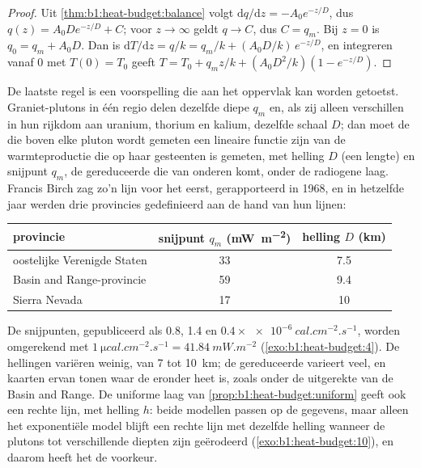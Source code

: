 \begin{proof}
Uit \cref{thm:b1:heat-budget:balance} volgt $\mathrm dq/\mathrm dz =
-A_0e^{-z/D}$, dus $q(z) = A_0 D e^{-z/D} + C$; voor $z \to \infty$ geldt $q \to C$,
dus $C = q_m$. Bij $z = 0$ is $q_0 = q_m + A_0 D$. Dan is $\mathrm dT/\mathrm dz =
q/k = q_m/k + (A_0D/k)\,e^{-z/D}$, en integreren vanaf $0$ met $T(0) = T_0$ geeft
$T = T_0 + q_m z/k + (A_0 D^2/k)(1 - e^{-z/D})$.
\end{proof}

De laatste regel is een voorspelling die aan het oppervlak kan worden getoetst. Graniet-plutons in één regio delen dezelfde diepe  $q_m$ en, als zij alleen verschillen in hun rijkdom aan uranium, thorium en kalium, dezelfde schaal $D$; dan moet de  die boven elke pluton wordt gemeten een lineaire functie zijn van de warmteproductie die op haar gesteenten is gemeten, met helling $D$ (een lengte) en snijpunt $q_m$, de gereduceerde  die van onderen komt, onder de radiogene laag. Francis Birch zag zo'n lijn voor het eerst, gerapporteerd in 1968, en in hetzelfde jaar werden drie provincies gedefinieerd aan de hand van hun lijnen:
\begin{center}
\small
\begin{tabular}{lcc}
\hline
provincie & snijpunt $q_m$ (\unit{mW.m^{-2}}) & helling $D$ (\unit{km}) \\
\hline
oostelijke Verenigde Staten & 33 & 7.5 \\
Basin and Range-provincie & 59 & 9.4 \\
Sierra Nevada & 17 & 10 \\
\hline
\end{tabular}
\end{center}
De snijpunten, gepubliceerd als 0.8, 1.4 en $0.4\times\qty{e-6}{cal.cm^{-2}.s^{-1}}$, worden omgerekend met $\qty{1}{\micro cal.cm^{-2}.s^{-1}} = \qty{41.84}{mW.m^{-2}}$ (\cref{exo:b1:heat-budget:4}). De hellingen variëren weinig, van 7 tot \qty{10}{km}; de gereduceerde  varieert veel, en kaarten ervan tonen waar de  eronder heet is, zoals onder de uitgerekte  van de Basin and Range. De uniforme laag van \cref{prop:b1:heat-budget:uniform} geeft ook een rechte lijn, met helling $h$: beide modellen passen op de gegevens, maar alleen het exponentiële model blijft een rechte lijn met dezelfde helling wanneer de plutons tot verschillende diepten zijn geërodeerd (\cref{exo:b1:heat-budget:10}), en daarom heeft het de voorkeur.

